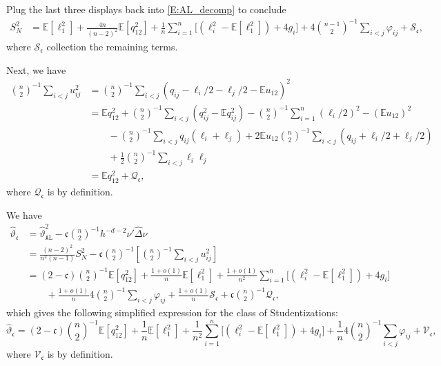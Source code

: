 \documentclass[11pt]{article}
\numberwithin{equation}{section}
\theoremstyle{definition}
\newcommand{\E}{\mathbb{E}}
\newcommand{\Scale}{\vartheta}
\begin{document}
Plug the last three displays back into \eqref{E:AL_decomp}
to conclude
\begin{align*}
    S_N^2 &= \E[\ell_1^2] +  \frac{4n}{(n-2)^2}\E [q_{12}^2] + \frac{1}{n}\sum_{i=1}^n\big[(\ell_i^2-\E[\ell_1^2]) + 4 g_i\big] + 4\binom{n-1}{2}^{-1}\sum_{i<j}\varphi_{ij} +\mathcal{S}_\mathfrak{c},
\end{align*}
where $\mathcal{S}_\mathfrak{c}$ collection the remaining terms.

Next, we have
\begin{align*}
    \binom{n}{2}^{-1} \sum_{i<j} u_{ij}^2
    &= \binom{n}{2}^{-1} \sum_{i<j} (q_{ij} - \ell_i/2 - \ell_j/2 - \E u_{12})^2\\
    &= \E q_{12}^2 + \binom{n}{2}^{-1} \sum_{i<j} (q_{ij}^2 - \E q_{ij}^2) - \binom{n}{2}^{-1} \sum_{i=1}^n (\ell_i/2)^2  - (\E u_{12})^2\\
    &\qquad - \binom{n}{2}^{-1} \sum_{i<j} q_{ij} (\ell_i+\ell_j) + 2 \E u_{12} \binom{n}{2}^{-1} \sum_{i<j} (q_{ij} + \ell_i/2 + \ell_j/2)\\
    &\qquad + \frac{1}{2} \binom{n}{2}^{-1} \sum_{i<j} \ell_i \ell_j\\
    &= \E q_{12}^2 + \mathcal{Q}_\mathfrak{c},
\end{align*}
where $\mathcal{Q}_\mathfrak{c}$ is by definition.

We have
\begin{align*}
    \widehat{\Scale}_\mathfrak{c} 
    &= \widehat{\Scale}_\mathtt{AL}^2 - \mathfrak{c} \binom{n}{2}^{-1} h^{-d-2} \nu'\widehat{\Delta}\nu\\
    &= \frac{(n-2)^2}{n^2(n-1)} S_N^2 - \mathfrak{c} \binom{n}{2}^{-1} \left[\binom{n}{2}^{-1} \sum_{i<j} u_{ij}^2 \right]\\
    &= (2-\mathfrak{c}) \binom{n}{2}^{-1} \E [q_{12}^2] + \frac{1+o(1)}{n}\E[\ell_1^2]  + \frac{1+o(1)}{n^2}\sum_{i=1}^n\big[(\ell_i^2-\E[\ell_1^2]) + 4 g_i\big]\\
    &\qquad + \frac{1+o(1)}{n} 4 \binom{n}{2}^{-1} \sum_{i<j}\varphi_{ij}
    + \frac{1+o(1)}{n}\mathcal{S}_\mathfrak{c} + \mathfrak{c} \binom{n}{2}^{-1} \mathcal{Q}_\mathfrak{c},
\end{align*}
which gives the following simplified expression for the class of Studentizations:
\begin{equation}\label{E:altdecompstudent}
    \widehat{\Scale}_\mathfrak{c} 
    = (2-\mathfrak{c}) \binom{n}{2}^{-1} \E [q_{12}^2] + \frac{1}{n}\E[\ell_1^2]  + \frac{1}{n^2}\sum_{i=1}^n\big[(\ell_i^2-\E[\ell_1^2]) + 4 g_i\big] + \frac{1}{n} 4 \binom{n}{2}^{-1} \sum_{i<j}\varphi_{ij} + \mathcal{V}_\mathfrak{c},
\end{equation}
where $\mathcal{V}_\mathfrak{c}$ is by definition.
\end{document}
